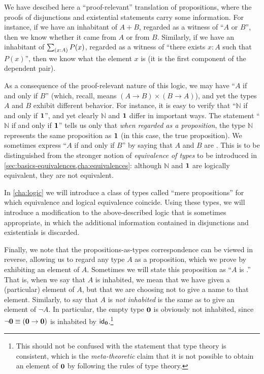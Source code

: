 \mentalpause

We have descibed here a ``proof-relevant''
%
translation of propositions, where the proofs of disjunctions and existential statements carry some information.
For instance, if we have an inhabitant of $A+B$, regarded as a witness of ``$A$ or $B$'', then we know whether it came from $A$ or from $B$.
Similarly, if we have an inhabitant of $\sm{x:A} P(x)$, regarded as a witness of ``there exists $x:A$ such that $P(x)$'', then we know what the element $x$ is (it is the first component of the dependent pair).

As a consequence of the proof-relevant nature of this logic, we may have ``$A$ if and only if $B$'' (which, recall, means $(A\to B)\times (B\to A)$), and yet the types $A$ and $B$ exhibit different behavior.
For instance, it is easy to verify that ``$\mathbb{N}$ if and only if $\unit$'', and yet clearly $\mathbb{N}$ and $\unit$ differ in important ways.
The statement ``$\mathbb{N}$ if and only if $\unit$'' tells us only that \emph{when regarded as a proposition}, the type $\mathbb{N}$ represents the same proposition as $\unit$ (in this case, the true proposition).
We sometimes express ``$A$ if and only if $B$'' by saying that $A$ and $B$ are .
%
%
This is to be distinguished from the stronger notion of \emph{equivalence of types} to be introduced in \autoref{sec:basics-equivalences,cha:equivalences}:
although $\mathbb{N}$ and $\unit$ are logically equivalent, they are not equivalent.

In \autoref{cha:logic} we will introduce a class of types called ``mere propositions'' for which equivalence and logical equivalence coincide.
Using these types, we will introduce a modification to the above-described logic that is sometimes appropriate, in which the additional information contained in disjunctions and existentials is discarded.

Finally, we note that the propositions-as-types correspondence can be viewed in reverse, allowing us to regard any type $A$ as a proposition, which we prove by exhibiting an element of $A$.
Sometimes we will state this proposition as ``$A$ is .''
%
%
That is, when we say that $A$ is inhabited, we mean that we have given a (particular) element of $A$, but that we are choosing not to give a name to that element.
Similarly, to say that $A$ is \emph{not inhabited} is the same as to give an element of $\neg A$.
In particular, the empty type $\emptyt$ is obviously not inhabited, since $\neg \emptyt \jdeq (\emptyt \to \emptyt)$ is inhabited by $\idfunc[\emptyt]$.\footnote{This should not be confused with the statement that type theory is consistent, which is the \emph{meta-theoretic} claim that it is not possible to obtain an element of $\emptyt$ by following the rules of type theory.}

